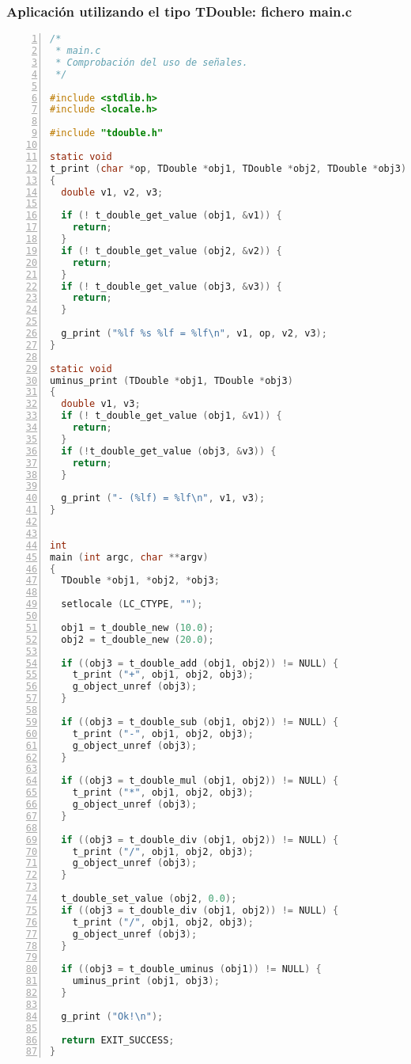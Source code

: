 \subsubsection{Aplicación utilizando el tipo \textsf{TDouble}: fichero \textsf{main.c}}
\begin{lstlisting}[language=C, numbers=left]
/*
 * main.c
 * Comprobación del uso de señales.
 */

#include <stdlib.h>
#include <locale.h>

#include "tdouble.h"

static void
t_print (char *op, TDouble *obj1, TDouble *obj2, TDouble *obj3)
{
  double v1, v2, v3;

  if (! t_double_get_value (obj1, &v1)) {
    return;
  }
  if (! t_double_get_value (obj2, &v2)) {
    return;
  }
  if (! t_double_get_value (obj3, &v3)) {
    return;
  }

  g_print ("%lf %s %lf = %lf\n", v1, op, v2, v3);
}

static void
uminus_print (TDouble *obj1, TDouble *obj3)
{
  double v1, v3;
  if (! t_double_get_value (obj1, &v1)) {
    return;
  }
  if (!t_double_get_value (obj3, &v3)) {
    return;
  }
  
  g_print ("- (%lf) = %lf\n", v1, v3); 
}


int
main (int argc, char **argv)
{
  TDouble *obj1, *obj2, *obj3;

  setlocale (LC_CTYPE, "");

  obj1 = t_double_new (10.0);
  obj2 = t_double_new (20.0);

  if ((obj3 = t_double_add (obj1, obj2)) != NULL) {
    t_print ("+", obj1, obj2, obj3);
    g_object_unref (obj3);
  }

  if ((obj3 = t_double_sub (obj1, obj2)) != NULL) {
    t_print ("-", obj1, obj2, obj3);
    g_object_unref (obj3);
  }

  if ((obj3 = t_double_mul (obj1, obj2)) != NULL) {
    t_print ("*", obj1, obj2, obj3);
    g_object_unref (obj3);
  }
 
  if ((obj3 = t_double_div (obj1, obj2)) != NULL) {
    t_print ("/", obj1, obj2, obj3);
    g_object_unref (obj3);
  }

  t_double_set_value (obj2, 0.0);
  if ((obj3 = t_double_div (obj1, obj2)) != NULL) {
    t_print ("/", obj1, obj2, obj3);
    g_object_unref (obj3);
  }

  if ((obj3 = t_double_uminus (obj1)) != NULL) {
    uminus_print (obj1, obj3);
  }

  g_print ("Ok!\n");

  return EXIT_SUCCESS;
}  
\end{lstlisting}

